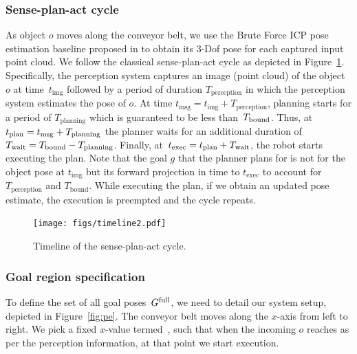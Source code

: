 \documentclass[a4paper]{report}
\begin{document}
\subsubsection{Sense-plan-act cycle}
As object $o$ moves along the conveyor belt, we use the Brute Force ICP pose estimation baseline proposed in \cite{narayanan2016perch} to obtain its 3-Dof pose for each captured input point cloud.
We follow the classical sense-plan-act cycle as depicted in Figure~\ref{fig:tl}.
Specifically, 
the perception system captures an image (point cloud) of the object~$o$ at time~$t_{\textrm{img}}$
followed by a period of duration $T_{\textrm{perception}}$ in which the perception system estimates the pose of $o$.
At time $t_{\textrm{msg}} = t_{\textrm{img}} + T_{\textrm{perception}}$, planning starts for a period of $T_{\textrm{planning}}$ which is guaranteed to be less than~$T_{\textrm{bound}}$.
Thus, at $t_{\textrm{plan}} = t_{\textrm{msg}} + T_{\rm planning}$ the planner waits for an additional duration of $T_{\rm wait} = T_{\textrm{bound}} - T_{\rm planning}$.
Finally, at~$t_{\textrm{exec}} = t_{\textrm{plan}} + T_{\rm wait}$, the robot starts executing the plan. Note that the goal $g$ that the planner plans for is not for the object pose at $t_{\textrm{img}}$ but its forward projection in time to $t_{\textrm{exec}}$ to account for $T_{\textrm{perception}}$ and $T_{\textrm{bound}}$.
While executing the plan, if we obtain an updated pose estimate, the execution is preempted and the cycle repeats.

\begin{figure}[t]
    \centering
     \texttt{[image: figs/timeline2.pdf]}
    \caption{\CaptionTextSize Timeline of the sense-plan-act cycle.}
    \label{fig:tl}
\end{figure}

\subsubsection{Goal region specification}
\label{sec:goal_region}
To define the set of all goal poses~$G^{\textrm{full}}$, we need to detail our system setup, depicted in Figure~\ref{fig:pe}.
The conveyor belt moves along the $x$-axis from left to right.
We pick a fixed $x$-value termed~\Xexec, such that when the incoming $o$ reaches \Xexec as per the perception information, at that point we start execution.
\end{document}
